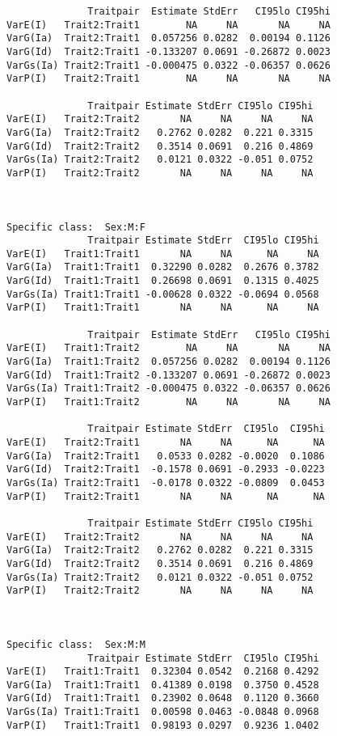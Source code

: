 \documentclass[titlepage]{article}  %
\begin{document}
\begin{verbatim}
              Traitpair  Estimate StdErr   CI95lo CI95hi
VarE(I)   Trait2:Trait1        NA     NA       NA     NA
VarG(Ia)  Trait2:Trait1  0.057256 0.0282  0.00194 0.1126
VarG(Id)  Trait2:Trait1 -0.133207 0.0691 -0.26872 0.0023
VarGs(Ia) Trait2:Trait1 -0.000475 0.0322 -0.06357 0.0626
VarP(I)   Trait2:Trait1        NA     NA       NA     NA

              Traitpair Estimate StdErr CI95lo CI95hi
VarE(I)   Trait2:Trait2       NA     NA     NA     NA
VarG(Ia)  Trait2:Trait2   0.2762 0.0282  0.221 0.3315
VarG(Id)  Trait2:Trait2   0.3514 0.0691  0.216 0.4869
VarGs(Ia) Trait2:Trait2   0.0121 0.0322 -0.051 0.0752
VarP(I)   Trait2:Trait2       NA     NA     NA     NA



Specific class:  Sex:M:F 
              Traitpair Estimate StdErr  CI95lo CI95hi
VarE(I)   Trait1:Trait1       NA     NA      NA     NA
VarG(Ia)  Trait1:Trait1  0.32290 0.0282  0.2676 0.3782
VarG(Id)  Trait1:Trait1  0.26698 0.0691  0.1315 0.4025
VarGs(Ia) Trait1:Trait1 -0.00628 0.0322 -0.0694 0.0568
VarP(I)   Trait1:Trait1       NA     NA      NA     NA

              Traitpair  Estimate StdErr   CI95lo CI95hi
VarE(I)   Trait1:Trait2        NA     NA       NA     NA
VarG(Ia)  Trait1:Trait2  0.057256 0.0282  0.00194 0.1126
VarG(Id)  Trait1:Trait2 -0.133207 0.0691 -0.26872 0.0023
VarGs(Ia) Trait1:Trait2 -0.000475 0.0322 -0.06357 0.0626
VarP(I)   Trait1:Trait2        NA     NA       NA     NA

              Traitpair Estimate StdErr  CI95lo  CI95hi
VarE(I)   Trait2:Trait1       NA     NA      NA      NA
VarG(Ia)  Trait2:Trait1   0.0533 0.0282 -0.0020  0.1086
VarG(Id)  Trait2:Trait1  -0.1578 0.0691 -0.2933 -0.0223
VarGs(Ia) Trait2:Trait1  -0.0178 0.0322 -0.0809  0.0453
VarP(I)   Trait2:Trait1       NA     NA      NA      NA

              Traitpair Estimate StdErr CI95lo CI95hi
VarE(I)   Trait2:Trait2       NA     NA     NA     NA
VarG(Ia)  Trait2:Trait2   0.2762 0.0282  0.221 0.3315
VarG(Id)  Trait2:Trait2   0.3514 0.0691  0.216 0.4869
VarGs(Ia) Trait2:Trait2   0.0121 0.0322 -0.051 0.0752
VarP(I)   Trait2:Trait2       NA     NA     NA     NA



Specific class:  Sex:M:M 
              Traitpair Estimate StdErr  CI95lo CI95hi
VarE(I)   Trait1:Trait1  0.32304 0.0542  0.2168 0.4292
VarG(Ia)  Trait1:Trait1  0.41389 0.0198  0.3750 0.4528
VarG(Id)  Trait1:Trait1  0.23902 0.0648  0.1120 0.3660
VarGs(Ia) Trait1:Trait1  0.00598 0.0463 -0.0848 0.0968
VarP(I)   Trait1:Trait1  0.98193 0.0297  0.9236 1.0402


\end{verbatim}
\end{document}
